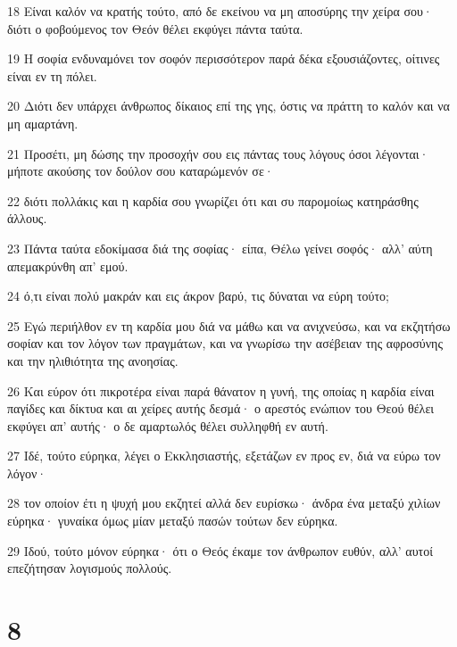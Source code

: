 \par 18 Είναι καλόν να κρατής τούτο, από δε εκείνου να μη αποσύρης την χείρα σου· διότι ο φοβούμενος τον Θεόν θέλει εκφύγει πάντα ταύτα.
\par 19 Η σοφία ενδυναμόνει τον σοφόν περισσότερον παρά δέκα εξουσιάζοντες, οίτινες είναι εν τη πόλει.
\par 20 Διότι δεν υπάρχει άνθρωπος δίκαιος επί της γης, όστις να πράττη το καλόν και να μη αμαρτάνη.
\par 21 Προσέτι, μη δώσης την προσοχήν σου εις πάντας τους λόγους όσοι λέγονται· μήποτε ακούσης τον δούλον σου καταρώμενόν σε·
\par 22 διότι πολλάκις και η καρδία σου γνωρίζει ότι και συ παρομοίως κατηράσθης άλλους.
\par 23 Πάντα ταύτα εδοκίμασα διά της σοφίας· είπα, Θέλω γείνει σοφός· αλλ' αύτη απεμακρύνθη απ' εμού.
\par 24 ό,τι είναι πολύ μακράν και εις άκρον βαρύ, τις δύναται να εύρη τούτο;
\par 25 Εγώ περιήλθον εν τη καρδία μου διά να μάθω και να ανιχνεύσω, και να εκζητήσω σοφίαν και τον λόγον των πραγμάτων, και να γνωρίσω την ασέβειαν της αφροσύνης και την ηλιθιότητα της ανοησίας.
\par 26 Και εύρον ότι πικροτέρα είναι παρά θάνατον η γυνή, της οποίας η καρδία είναι παγίδες και δίκτυα και αι χείρες αυτής δεσμά· ο αρεστός ενώπιον του Θεού θέλει εκφύγει απ' αυτής· ο δε αμαρτωλός θέλει συλληφθή εν αυτή.
\par 27 Ιδέ, τούτο εύρηκα, λέγει ο Εκκλησιαστής, εξετάζων εν προς εν, διά να εύρω τον λόγον·
\par 28 τον οποίον έτι η ψυχή μου εκζητεί αλλά δεν ευρίσκω· άνδρα ένα μεταξύ χιλίων εύρηκα· γυναίκα όμως μίαν μεταξύ πασών τούτων δεν εύρηκα.
\par 29 Ιδού, τούτο μόνον εύρηκα· ότι ο Θεός έκαμε τον άνθρωπον ευθύν, αλλ' αυτοί επεζήτησαν λογισμούς πολλούς.

\chapter{8}

